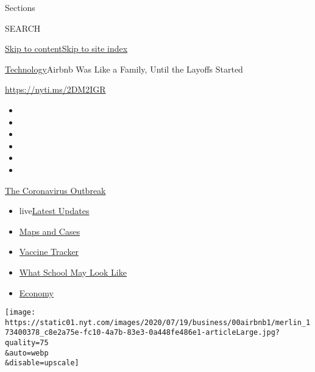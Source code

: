 Sections

SEARCH

\protect\hyperlink{site-content}{Skip to
content}\protect\hyperlink{site-index}{Skip to site index}

\href{/section/technology}{Technology}\textbar{}Airbnb Was Like a
Family, Until the Layoffs Started

\url{https://nyti.ms/2DM2IGR}

\begin{itemize}
\item
\item
\item
\item
\item
\item
\end{itemize}

\href{https://www.nytimes.com/news-event/coronavirus?action=click\&pgtype=Article\&state=default\&region=TOP_BANNER\&context=storylines_menu}{The
Coronavirus Outbreak}

\begin{itemize}
\tightlist
\item
  live\href{https://www.nytimes.com/2020/08/01/world/coronavirus-covid-19.html?action=click\&pgtype=Article\&state=default\&region=TOP_BANNER\&context=storylines_menu}{Latest
  Updates}
\item
  \href{https://www.nytimes.com/interactive/2020/us/coronavirus-us-cases.html?action=click\&pgtype=Article\&state=default\&region=TOP_BANNER\&context=storylines_menu}{Maps
  and Cases}
\item
  \href{https://www.nytimes.com/interactive/2020/science/coronavirus-vaccine-tracker.html?action=click\&pgtype=Article\&state=default\&region=TOP_BANNER\&context=storylines_menu}{Vaccine
  Tracker}
\item
  \href{https://www.nytimes.com/interactive/2020/07/29/us/schools-reopening-coronavirus.html?action=click\&pgtype=Article\&state=default\&region=TOP_BANNER\&context=storylines_menu}{What
  School May Look Like}
\item
  \href{https://www.nytimes.com/live/2020/07/31/business/stock-market-today-coronavirus?action=click\&pgtype=Article\&state=default\&region=TOP_BANNER\&context=storylines_menu}{Economy}
\end{itemize}

\texttt{[image: https://static01.nyt.com/images/2020/07/19/business/00airbnb1/merlin\_173400378\_c8e2a75e-fc10-4a7b-83e3-0a448fe486e1-articleLarge.jpg?quality=75\\\&auto=webp\\\&disable=upscale]}

